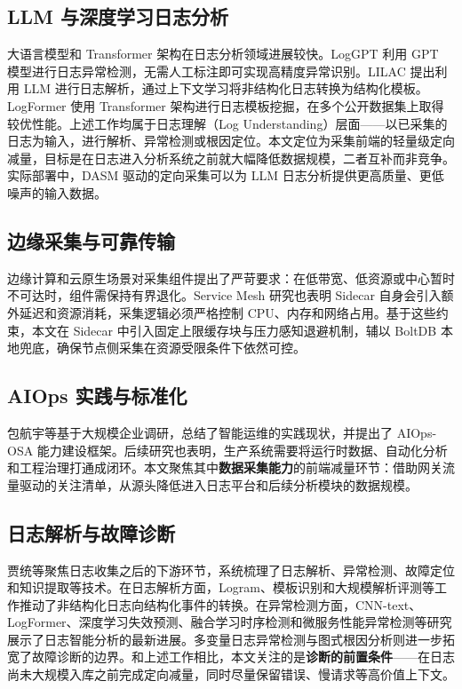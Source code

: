 \subsection{LLM 与深度学习日志分析}
大语言模型和 Transformer 架构在日志分析领域进展较快。LogGPT\cite{qi2023loggpt} 利用 GPT 模型进行日志异常检测，无需人工标注即可实现高精度异常识别。LILAC\cite{jiang2024lilac} 提出利用 LLM 进行日志解析，通过上下文学习将非结构化日志转换为结构化模板。LogFormer\cite{guo2024logformer} 使用 Transformer 架构进行日志模板挖掘，在多个公开数据集上取得较优性能。上述工作均属于日志理解（Log Understanding）层面——以已采集的日志为输入，进行解析、异常检测或根因定位。本文定位为采集前端的轻量级定向减量，目标是在日志进入分析系统之前就大幅降低数据规模，二者互补而非竞争。实际部署中，DASM 驱动的定向采集可以为 LLM 日志分析提供更高质量、更低噪声的输入数据。

\subsection{边缘采集与可靠传输}
边缘计算和云原生场景对采集组件提出了严苛要求：在低带宽、低资源或中心暂时不可达时，组件需保持有界退化\cite{varghese2022edge,usman2022observability,liu2017microcontainer}。Service Mesh 研究也表明 Sidecar 自身会引入额外延迟和资源消耗\cite{zhu2023sidecar,soldani2023ebpf}，采集逻辑必须严格控制 CPU、内存和网络占用。基于这些约束，本文在 Sidecar 中引入固定上限缓存块与压力感知退避机制，辅以 BoltDB 本地兜底，确保节点侧采集在资源受限条件下依然可控。

\subsection{AIOps 实践与标准化}
包航宇等\cite{bao2023aiops}基于大规模企业调研，总结了智能运维的实践现状，并提出了 AIOps-OSA 能力建设框架。后续研究也表明，生产系统需要将运行时数据、自动化分析和工程治理打通成闭环\cite{cheng2023aiops,diaz2023mlopsaiops,moreschini2023microai}。本文聚焦其中\textbf{数据采集能力}的前端减量环节：借助网关流量驱动的关注清单，从源头降低进入日志平台和后续分析模块的数据规模。

\subsection{日志解析与故障诊断}
贾统等\cite{jiatong2020logdiag}聚焦日志收集之后的下游环节，系统梳理了日志解析、异常检测、故障定位和知识提取等技术。在日志解析方面，Logram、模板识别和大规模解析评测等工作推动了非结构化日志向结构化事件的转换\cite{dai2020logram,khan2022logtemplate,jiang2023logparsing}。在异常检测方面，CNN-text、LogFormer、深度学习失效预测、融合学习时序检测和微服务性能异常检测等研究展示了日志智能分析的最新进展\cite{meiyudong2020logcnn,guo2024logformer,ali2025logml,hadadi2024logfailure,zhou2023fusionad,fang2024microperf,zhang2024reducing}。多变量日志异常检测与图式根因分析则进一步拓宽了故障诊断的边界\cite{zhang2024multivariate,soldani2020graphrca}。和上述工作相比，本文关注的是\textbf{诊断的前置条件}——在日志尚未大规模入库之前完成定向减量，同时尽量保留错误、慢请求等高价值上下文。

